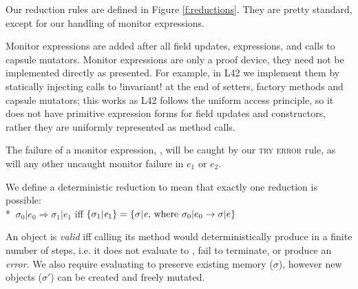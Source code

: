 Our reduction rules are defined in Figure \ref{f:reductions}.
They are pretty standard, except for our handling of monitor expressions.


\noindent Monitor expressions are added after all field updates, \Q@new@ expressions, and calls to capsule mutators.
Monitor expressions are only a proof device, they need not be implemented directly as presented.
For example, in L42 we implement them by statically injecting calls to \Q!invariant! at the end of setters, factory methods and capsule mutators; this works as L42 follows the uniform access principle, so it does not have primitive expression forms for field updates and constructors, rather they are uniformly represented as method calls.

The failure of a monitor expression, , will be caught by our \textsc{try error} rule, as will any other uncaught monitor failure in $e_1$ or $e_2$.

We define a deterministic reduction to mean that exactly one reduction is possible:\\*
\indent$\ \sigma_0|e_0\Rightarrow \sigma_1|e_1$ iff $\{\sigma_1|{\mathit{e}}_1\}=\{\sigma|{\mathit{e}} \text{, where } \sigma_0|e_0\rightarrow \sigma|e\}$

\noindent An object is \emph{valid} iff calling its \Q@invariant@ method would
deterministically produce \Q@true@ in a finite number of steps, i.e. it does not evaluate to \Q@false@, fail to terminate, or produce an \emph{error}.
We also require evaluating \Q@invariant@ to preserve existing memory ($\sigma$), however new objects ($\sigma'$) can be created and freely mutated.

